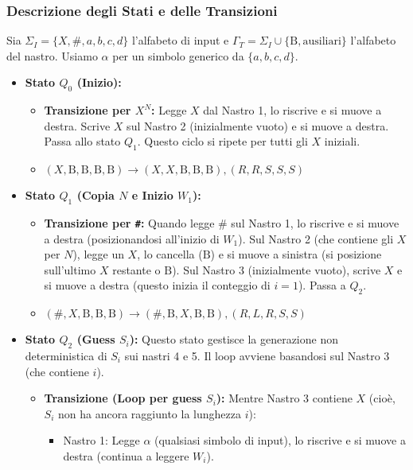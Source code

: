 \documentclass[a4paper, 11pt]{book} %
\theoremstyle{definition}
\newcommand{\B}{\text{B}} %
\begin{document}
\subsubsection{Descrizione degli Stati e delle Transizioni}
Sia $\Sigma_I = \{X, \#, a,b,c,d\}$ l'alfabeto di input e $\Gamma_T = \Sigma_I \cup \{\B, \text{ausiliari}\}$ l'alfabeto del nastro. Usiamo $\alpha$ per un simbolo generico da $\{a,b,c,d\}$.

\begin{itemize}
    \item \textbf{Stato $Q_0$ (Inizio):}
        \begin{itemize}
            \item \textbf{Transizione per $X^N$:} Legge $X$ dal Nastro 1, lo riscrive e si muove a destra. Scrive $X$ sul Nastro 2 (inizialmente vuoto) e si muove a destra. Passa allo stato $Q_1$. Questo ciclo si ripete per tutti gli $X$ iniziali.
            \item $(X, \B, \B, \B, \B) \to (X, X, \B, \B, \B), (R,R,S,S,S)$
        \end{itemize}
    \item \textbf{Stato $Q_1$ (Copia $N$ e Inizio $W_1$):}
        \begin{itemize}
            \item \textbf{Transizione per \texttt{\#}:} Quando legge $\#$ sul Nastro 1, lo riscrive e si muove a destra (posizionandosi all'inizio di $W_1$). Sul Nastro 2 (che contiene gli $X$ per $N$), legge un $X$, lo cancella ($\B$) e si muove a sinistra (si posizione sull'ultimo $X$ restante o $\B$). Sul Nastro 3 (inizialmente vuoto), scrive $X$ e si muove a destra (questo inizia il conteggio di $i=1$). Passa a $Q_2$.
            \item $(\#, X, \B, \B, \B) \to (\#, \B, X, \B, \B), (R,L,R,S,S)$
        \end{itemize}
    \item \textbf{Stato $Q_2$ (Guess $S_i$):}
        Questo stato gestisce la generazione non deterministica di $S_i$ sui nastri 4 e 5. Il loop avviene basandosi sul Nastro 3 (che contiene $i$).
        \begin{itemize}
            \item \textbf{Transizione (Loop per guess $S_i$):}
                Mentre Nastro 3 contiene $X$ (cioè, $S_i$ non ha ancora raggiunto la lunghezza $i$):
                \begin{itemize}
                    \item Nastro 1: Legge $\alpha$ (qualsiasi simbolo di input), lo riscrive e si muove a destra (continua a leggere $W_i$).

\end{itemize}
\end{itemize}
\end{itemize}
\end{document}
